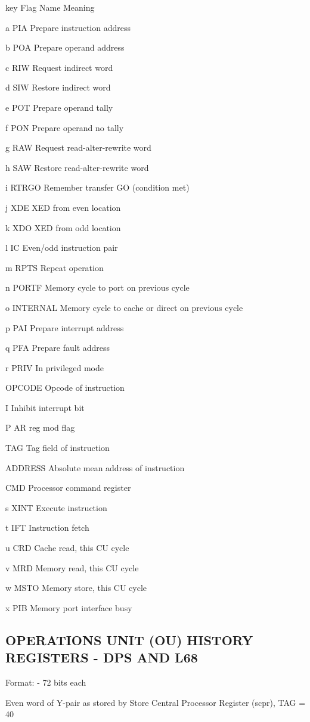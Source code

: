 key Flag Name Meaning

a PIA Prepare instruction address

b POA Prepare operand address

c RIW Request indirect word

d SIW Restore indirect word

e POT Prepare operand tally

f PON Prepare operand no tally

g RAW Request read-alter-rewrite word

h SAW Restore read-alter-rewrite word

i RTRGO Remember transfer GO (condition met)

j XDE XED from even location

k XDO XED from odd location

l IC Even/odd instruction pair

m RPTS Repeat operation

n PORTF Memory cycle to port on previous cycle

o INTERNAL Memory cycle to cache or direct on previous cycle

p PAI Prepare interrupt address

q PFA Prepare fault address

r PRIV In privileged mode

OPCODE Opcode of instruction

I Inhibit interrupt bit

P AR reg mod flag

TAG Tag field of instruction

ADDRESS Absolute mean address of instruction

CMD Processor command register

s XINT Execute instruction

t IFT Instruction fetch

u CRD Cache read, this CU cycle

v MRD Memory read, this CU cycle

w MSTO Memory store, this CU cycle

x PIB Memory port interface busy

\subsection{OPERATIONS UNIT (OU) HISTORY REGISTERS - DPS AND L68}

Format: - 72 bits each

Even word of Y-pair as stored by Store Central Processor Register (scpr), TAG = 40

